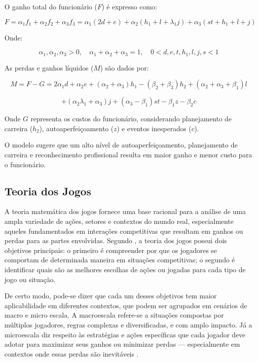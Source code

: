 \documentclass[
	article,			%
	11pt,				%
	oneside,			%
	a4paper,			%
	english,			%
	brazil,				%
	sumario=tradicional
	]{abntex2}
\begin{document}
O ganho total do funcionário (\( F \)) é expresso como:

\begin{equation}
    F = \alpha_1 f_1 + \alpha_2 f_2 + \alpha_3 f_3 = \alpha_1 (2d + e) + \alpha_2 (h_1 + l + \lambda_1 j) + \alpha_3 (st + h_1 + l + j)
\end{equation}

Onde:

\begin{equation}
    \alpha_1, \alpha_2, \alpha_3 > 0, \quad \alpha_1 + \alpha_2 + \alpha_3 = 1, \quad 0 < d, e, t, h_1, l, j, s < 1
\end{equation}

As perdas e ganhos líquidos (\( M \)) são dados por:

\begin{equation}
    M = F - G = 2\alpha_1 d + \alpha_2 e + (\alpha_2 + \alpha_3) h_1 - (\beta_2 + \beta_3) h_2 + (\alpha_2 + \alpha_3 + \beta_1) l 
\end{equation}

\begin{equation}
    + (\alpha_2 \lambda_1 + \alpha_3) j + (\alpha_3 - \beta_1) st - \beta_1 z - \beta_2 c
\end{equation}

Onde \( G \) representa os custos do funcionário, considerando planejamento de carreira (\( h_2 \)), autoaperfeiçoamento (\( z \)) e eventos inesperados (\( c \)).

O modelo sugere que um alto nível de autoaperfeiçoamento, planejamento de carreira e reconhecimento profissional resulta em maior ganho e menor custo para o funcionário.


\subsection{Teoria dos Jogos}

A teoria matemática dos jogos fornece uma base racional para a análise de uma ampla variedade de ações, setores e contextos do mundo real, especialmente aqueles fundamentados em interações competitivas que resultam em ganhos ou perdas para as partes envolvidas. Segundo \cite{morris1994introduction}, a teoria dos jogos possui dois objetivos principais: o primeiro é compreender por que os jogadores se comportam de determinada maneira em situações competitivas; o segundo é identificar quais são as melhores escolhas de ações ou jogadas para cada tipo de jogo ou situação.

De certo modo, pode-se dizer que cada um desses objetivos tem maior aplicabilidade em diferentes contextos, que podem ser agrupados em cenários de macro e micro escala. A macroescala refere-se a situações compostas por múltiplos jogadores, regras complexas e diversificadas, e com amplo impacto. Já a microescala diz respeito às estratégias e ações específicas que cada jogador deve adotar para maximizar seus ganhos ou minimizar perdas — especialmente em contextos onde essas perdas são inevitáveis \cite{morris1994introduction}.
\end{document}
